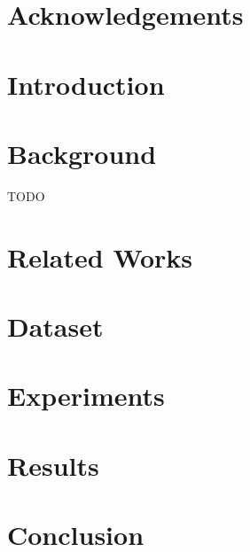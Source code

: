 \documentclass[11pt]{book}
\begin{document}

\doublespacing



\chapter*{Acknowledgements}



\tableofcontents{}
\listoffigures
\listoftables
\clearpage


% 

\chapter {Introduction}


\chapter {Background}
{\color{green}TODO}


\chapter {Related Works}
\label{literature}


\chapter{Dataset}
\label{sec:dataset}


\chapter{Experiments}
\label{sec:exp}


\chapter {Results}
\label{chapter:four}


\chapter{Conclusion}


\renewcommand{\bibname}{References}
	

\end{document}
